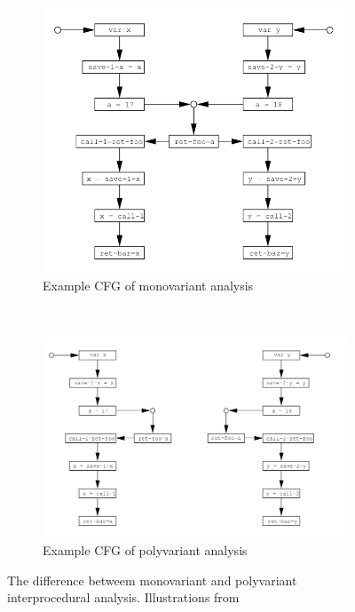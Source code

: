 \begin{figure}[H]

  \begin{subfigure}[b]{\textwidth}
    \centering
    \includegraphics[width=.6\textwidth]{figures/monovariant}
    \caption{Example CFG of monovariant analysis}
    \label{monovariant}
  \end{subfigure}
 ~ 
  \begin{subfigure}[b]{\textwidth}
    \centering
    \includegraphics[width=.7\textwidth]{figures/polyvariant}
    \caption{Example CFG of polyvariant analysis}
    \label{polyvariant}
  \end{subfigure}
  
  \caption{The difference betweem monovariant and polyvariant interprocedural analysis. Illustrations from \citet[p.~40]{schwartzbach}}
  \label{monopoly}
\end{figure}

